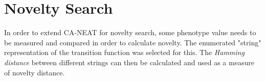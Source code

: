 \section{Novelty Search}
In order to extend CA-NEAT for novelty search, some phenotype value needs to be measured and compared in order to calculate novelty.
The enumerated "string" representation of the transition function was selected for this.
The \textit{Hamming distance} between different strings can then be calculated and used as a measure of novelty distance.
